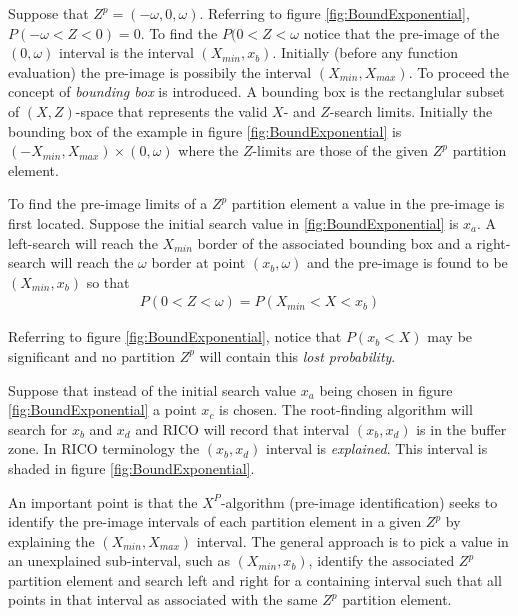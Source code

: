 Suppose that $Z^p = (-\omega, 0, \omega)$. Referring to figure \ref{fig:BoundExponential}, $P(-\omega < Z < 0) = 0$. To find the $P(0 < Z < \omega$ notice that the pre-image of the $(0, \omega)$ interval is the interval $(X_{min}, x_b)$. Initially (before any function evaluation) the pre-image is possibily the interval $(X_{min}, X_{max})$. To proceed the concept of \emph{bounding box} is introduced. A bounding box is the rectanglular subset of $(X,Z)$-space that represents the valid $X$- and $Z$-search limits. Initially the bounding box of the example in figure \ref{fig:BoundExponential} is $(-X_{min}, X_{max})\times(0, \omega)$ where the $Z$-limits are those of the given $Z^p$ partition element.

To find the pre-image limits of a $Z^p$ partition element a value in the pre-image is first located. Suppose the initial search value in \ref{fig:BoundExponential} is $x_a$. A left-search will reach the $X_{min}$ border of the associated bounding box and a right-search will reach the $\omega$ border at point $(x_b, \omega)$ and the pre-image is found to be $(X_{min}, x_b)$ so that
\begin{align*}
P(0 < Z < \omega) = P(X_{min} < X < x_b)
\end{align*}

Referring to figure \ref{fig:BoundExponential}, notice that $P(x_b < X)$ may be significant and no partition $Z^p$ will contain this \emph{lost probability}.

Suppose that instead of the initial search value $x_a$ being chosen in figure \ref{fig:BoundExponential} a point $x_c$ is chosen. The root-finding algorithm will search for $x_b$ and $x_d$ and RICO will record that interval $(x_b, x_d)$ is in the buffer zone. In RICO terminology the $(x_b, x_d)$ interval is \emph{explained}. This interval is shaded in figure \ref{fig:BoundExponential}. 

An important point is that the $X^P$-algorithm (pre-image identification) seeks to identify the pre-image intervals of each partition element in a given $Z^p$ by explaining the $(X_{min}, X_{max})$ interval. The general approach is to pick a value in an unexplained sub-interval, such as $(X_{min}, x_b)$, identify the associated $Z^p$ partition element and search left and right for a containing interval such that all points in that interval as associated with the same $Z^p$ partition element.


